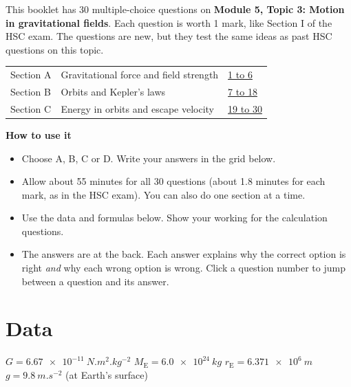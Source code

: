 
This booklet has 30 multiple-choice questions on \textbf{Module 5, Topic 3: Motion in
gravitational fields}. Each question is worth 1 mark, like Section I of the HSC exam. The
questions are new, but they test the same ideas as past HSC questions on this topic.

\begin{table}
  \centering
  \begin{tabular}{@{}L{22mm}L{82mm}L{30mm}@{}}
    \toprule
     &  & \\
    \midrule
    Section A & Gravitational force and field strength & \hyperlink{pq.1}{1 to 6}\\
    Section B & Orbits and Kepler's laws & \hyperlink{pq.7}{7 to 18}\\
    Section C & Energy in orbits and escape velocity & \hyperlink{pq.19}{19 to 30}\\
    \bottomrule
  \end{tabular}
\end{table}

\textbf{How to use it}
\begin{itemize}
  \item Choose A, B, C or D. Write your answers in the grid below.
  \item Allow about 55 minutes for all 30 questions (about 1.8 minutes for each mark, as in
        the HSC exam). You can also do one section at a time.
  \item Use the data and formulas below. Show your working for the calculation questions.
  \item The answers are at the back. Each answer explains why the correct option is right
        \emph{and} why each wrong option is wrong. Click a question number to jump between a
        question and its answer.
\end{itemize}

\section*{Data}
$G = \qty{6.67e-11}{N.m^2.kg^{-2}}$ \qquad
$M_\mathrm{E} = \qty{6.0e24}{kg}$ \qquad
$r_\mathrm{E} = \qty{6.371e6}{m}$ \qquad
$g = \qty{9.8}{m.s^{-2}}$ (at Earth's surface)


